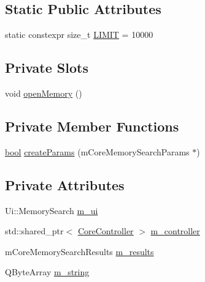 \subsection*{Static Public Attributes}
\begin{DoxyCompactItemize}
\item 
static constexpr size\+\_\+t \mbox{\hyperlink{class_q_g_b_a_1_1_memory_search_acd6fc184cead4d1c26ecc909a4d838fc}{L\+I\+M\+IT}} = 10000
\end{DoxyCompactItemize}
\subsection*{Private Slots}
\begin{DoxyCompactItemize}
\item 
void \mbox{\hyperlink{class_q_g_b_a_1_1_memory_search_a53bcce6f42eba9e70d695fd20be8b50f}{open\+Memory}} ()
\end{DoxyCompactItemize}
\subsection*{Private Member Functions}
\begin{DoxyCompactItemize}
\item 
\mbox{\hyperlink{libretro_8h_a4a26dcae73fb7e1528214a068aca317e}{bool}} \mbox{\hyperlink{class_q_g_b_a_1_1_memory_search_ad70f1e9611ee54c498ed3ee0e4a03adb}{create\+Params}} (m\+Core\+Memory\+Search\+Params $\ast$)
\end{DoxyCompactItemize}
\subsection*{Private Attributes}
\begin{DoxyCompactItemize}
\item 
Ui\+::\+Memory\+Search \mbox{\hyperlink{class_q_g_b_a_1_1_memory_search_a061f3ca9b3ce986236b30f055cf79d7a}{m\+\_\+ui}}
\item 
std\+::shared\+\_\+ptr$<$ \mbox{\hyperlink{class_q_g_b_a_1_1_core_controller}{Core\+Controller}} $>$ \mbox{\hyperlink{class_q_g_b_a_1_1_memory_search_ad528390bb7073b554329fd8f32525eea}{m\+\_\+controller}}
\item 
m\+Core\+Memory\+Search\+Results \mbox{\hyperlink{class_q_g_b_a_1_1_memory_search_a678359cba8766b6e6095604624b830e2}{m\+\_\+results}}
\item 
Q\+Byte\+Array \mbox{\hyperlink{class_q_g_b_a_1_1_memory_search_a32fb702b1bf62f28f699debee606c46d}{m\+\_\+string}}
\end{DoxyCompactItemize}


